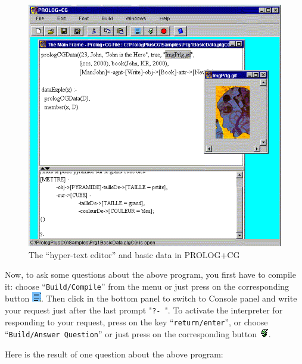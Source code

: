 \documentclass{book}
\begin{document}
\begin{htmlonly}

\begin{figure}
\begin{center}
\includegraphics{MMDataEnv.png}
\end{center}
\caption{\label{HyperTextEditor}The ``hyper-text editor'' and basic data in PROLOG+CG}
\end{figure}

\end{htmlonly}


Now, to ask some questions about the above program, you first have to
compile it: choose ``\texttt{Build/Compile}'' from the menu or just
press on the corresponding button \includegraphics{compile.png}. Then
click in the bottom panel to switch to Console panel and write your
request just after the last prompt "\texttt{?-~}". To activate the
interpreter for responding to your request, press on the key
``\texttt{return/enter}'', or choose ``\texttt{Build/Answer
Question}'' or just press on the corresponding button
\includegraphics{shortcut.png}.

Here is the result of one question about the above program:
\end{document}
